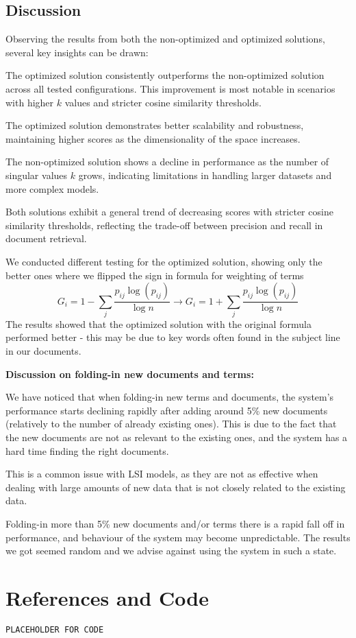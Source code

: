 \documentclass[12pt,a4paper]{article}
\begin{document}
\subsection{Discussion}
Observing the results from both the non-optimized and optimized solutions, several key insights can be drawn:
\begin{list}{-}{}
    \item The optimized solution consistently outperforms the non-optimized solution across all tested configurations. This improvement is most notable in scenarios with higher \( k \) values and stricter cosine similarity thresholds.
    \item The optimized solution demonstrates better scalability and robustness, maintaining higher scores as the dimensionality of the space increases.
    \item The non-optimized solution shows a decline in performance as the number of singular values \( k \) grows, indicating limitations in handling larger datasets and more complex models.
    \item Both solutions exhibit a general trend of decreasing scores with stricter cosine similarity thresholds, reflecting the trade-off between precision and recall in document retrieval.    
\end{list}

We conducted different testing for the optimized solution, showing only the better ones where we flipped the sign in formula for weighting of terms \[ G_i = 1 - \sum_{j} \frac{p_{ij} \log (p_{ij})}{\log n} \rightarrow G_i = 1 + \sum_{j} \frac{p_{ij} \log (p_{ij})}{\log n} \] 
The results showed that the optimized solution with the original formula performed better - this may be due to key words often found in the subject line in our documents.

\bigskip
\begin{flushleft}
    \textbf{Discussion on folding-in new documents and terms:}
\end{flushleft}


We have noticed that when folding-in new terms and documents, the system's performance starts declining rapidly after adding around 5\% new documents (relatively to the number of already existing ones). This is due to the fact that the new documents are not as relevant to the existing ones, and the system has a hard time finding the right documents. 

This is a common issue with LSI models, as they are not as effective when dealing with large amounts of new data that is not closely related to the existing data.

Folding-in more than 5\% new documents and/or terms there is a rapid fall off in performance, and behaviour of the system may become unpredictable. The results we got seemed random and we advise against using the system in such a state.
\newpage
\section{References and Code}

\begin{lstlisting}[style=Matlab-Pyglike]
PLACEHOLDER FOR CODE
\end{lstlisting}
\end{document}
